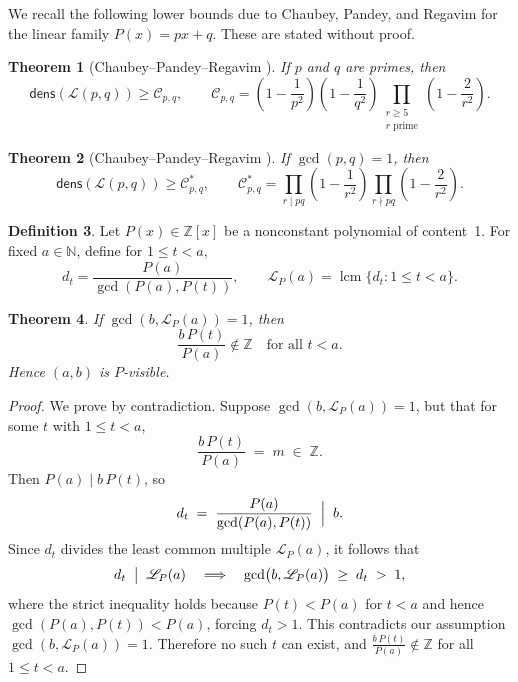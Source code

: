 \documentclass[12pt, reqno]{amsart}
\newtheorem{theorem}{Theorem}[section]
\theoremstyle{definition}
\newtheorem{definition}[theorem]{Definition}
\theoremstyle{remark}
\numberwithin{equation}{section}
\begin{document}
We recall the following lower bounds due to Chaubey, Pandey, and Regavim
\cite{Sneha} for the linear family \(P(x)=p x + q\).
These are stated without proof.

\begin{theorem}[Chaubey--Pandey--Regavim {\cite{Sneha}}]
If \(p\) and \(q\) are primes, then
\[
\mathsf{dens}(\mathcal{L}(p,q))
\ge
\mathcal{C}_{p,q},\qquad
\mathcal{C}_{p,q}
=\left(1-\frac1{p^2}\right)\left(1-\frac1{q^2}\right)
\prod_{\substack{r\ge5\\ r\text{ prime}}}
\left(1-\frac{2}{r^2}\right).
\]
\end{theorem}

\begin{theorem}[Chaubey--Pandey--Regavim {\cite{Sneha}}]
If \(\gcd(p,q)=1\), then
\[
\mathsf{dens}(\mathcal{L}(p,q))
\ge
\mathcal{C}_{p,q}^*,\qquad
\mathcal{C}_{p,q}^*
=\prod_{r\mid pq}\left(1-\frac{1}{r^2}\right)
\prod_{r\nmid pq}\left(1-\frac{2}{r^2}\right).
\]
\end{theorem}



\begin{definition}
Let \(P(x)\in\mathbb{Z}[x]\) be a nonconstant polynomial of content~1.  
For fixed \(a\in\mathbb{N}\), define for \(1\le t<a\),
\[
d_t=\frac{P(a)}{\gcd(P(a),P(t))},
\qquad
\mathscr{L}_P(a)=\operatorname{lcm}\{d_t:1\le t<a\}.
\]
\end{definition}

\begin{theorem}
If \(\gcd(b,\mathscr{L}_P(a))=1\), then
\[
\frac{b\,P(t)}{P(a)}\notin\mathbb{Z}
\quad \text{for all } t<a.
\]
Hence \((a,b)\) is \(P\)-visible.
\end{theorem}


\begin{proof}
We prove by contradiction.  Suppose
\(\gcd(b,\mathscr{L}_P(a))=1\), but that for some \(t\) with \(1\le t<a\),
\[
\frac{b\,P(t)}{P(a)} \;=\; m \;\in\;\mathbb{Z}.
\]
Then \(P(a)\mid b\,P(t)\), so
\[
d_t \;=\;\frac{P(a)}{\gcd(P(a),P(t))}
\;\Bigm|\;b.
\]
Since \(d_t\) divides the least common multiple \(\mathscr{L}_P(a)\), it follows that
\[
d_t \;\bigm|\;\mathscr{L}_P(a)
\quad\Longrightarrow\quad
\gcd\bigl(b,\mathscr{L}_P(a)\bigr)\;\ge\;d_t\;>\;1,
\]
where the strict inequality holds because \(P(t)<P(a)\) for \(t<a\)
and hence \(\gcd(P(a),P(t))<P(a)\), forcing \(d_t>1\).  This contradicts
our assumption \(\gcd(b,\mathscr{L}_P(a))=1\).  Therefore no such \(t\) can exist,
and
\(\tfrac{b\,P(t)}{P(a)}\notin\mathbb{Z}\) for all \(1\le t<a\).


\end{proof}
\end{document}
